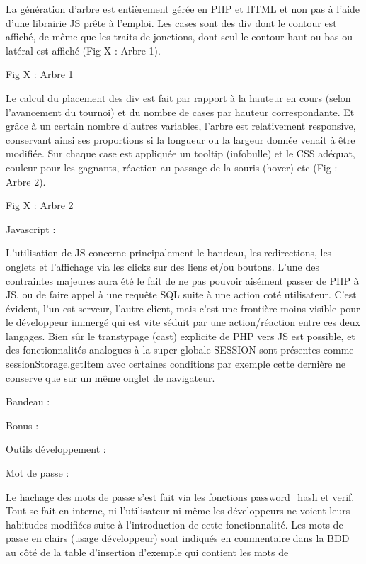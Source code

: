 \documentclass[12pt]{report}
\begin{document}
La génération d’arbre est entièrement gérée en PHP et HTML et non pas à l’aide d’une librairie
JS prête à l’emploi. Les cases sont des div dont le contour est affiché, de même que les traits de
jonctions, dont seul le contour haut ou bas ou latéral est affiché (Fig X : Arbre 1).
\bigskip
\par    
Fig X : Arbre 1
\bigskip
\par    
Le calcul du placement des div est fait par rapport à la hauteur en cours (selon l’avancement du
tournoi) et du nombre de cases par hauteur correspondante. Et grâce à un certain nombre d’autres
variables, l’arbre est relativement responsive, conservant ainsi ses proportions si la longueur ou la
largeur donnée venait à être modifiée. Sur chaque case est appliquée un tooltip (infobulle) et le CSS
adéquat, couleur pour les gagnants, réaction au passage de la souris (hover) etc (Fig : Arbre 2).
\bigskip
\par    
Fig X : Arbre 2
\bigskip
\par                
Javascript :
\bigskip
\par 
L’utilisation de JS concerne principalement le bandeau, les redirections, les onglets et
l’affichage via les clicks sur des liens et/ou boutons. L’une des contraintes majeures aura été le fait
de ne pas pouvoir aisément passer de PHP à JS, ou de faire appel à une requête SQL suite à une
action coté utilisateur. C’est évident, l’un est serveur, l’autre client, mais c’est une frontière moins
visible pour le développeur immergé qui est vite séduit par une action/réaction entre ces deux
langages. Bien sûr le transtypage (cast) explicite de PHP vers JS est possible, et des fonctionnalités
analogues à la super globale SESSION sont présentes comme sessionStorage.getItem avec certaines
conditions par exemple cette dernière ne conserve que sur un même onglet de navigateur.
\bigskip
\par    
Bandeau :
\bigskip
\par    
Bonus :
\bigskip
\par    
Outils développement :
\bigskip
\par            
Mot de passe :
\bigskip
\par                
Le hachage des mots de passe s’est fait via les fonctions password\_hash et verif. Tout se fait en
interne, ni l’utilisateur ni même les développeurs ne voient leurs habitudes modifiées suite à
l’introduction de cette fonctionnalité. Les mots de passe en clairs (usage développeur) sont indiqués
en commentaire dans la BDD au côté de la table d’insertion d’exemple qui contient les mots de
\end{document}
